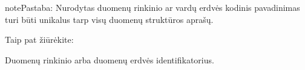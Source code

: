 \documentclass[letterpaper,10pt,lithuanian]{sphinxmanual}
\begin{document}
\begin{sphinxadmonition}{note}{Pastaba:}
\sphinxAtStartPar
Nurodytas duomenų rinkinio ar vardų erdvės kodinis pavadinimas turi būti
unikalus tarp visų duomenų struktūros aprašų.
\end{sphinxadmonition}


\begin{sphinxseealso}{Taip pat žiūrėkite:}

\begin{DUlineblock}{0em}
\item[] {\hyperref[\detokenize{vardu-erdves:ns}]{}}
\item[] {\hyperref[\detokenize{pavadinimai:kodiniai-pavadinimai}]{}}
\end{DUlineblock}


\end{sphinxseealso}


\begin{fulllineitems}
\label{\detokenize{dimensijos:dataset.id}}
\pysigstartsignatures
{}
\pysigstopsignatures
\sphinxAtStartPar
Duomenų rinkinio arba duomenų erdvės identifikatorius.

\end{fulllineitems}

\end{document}
